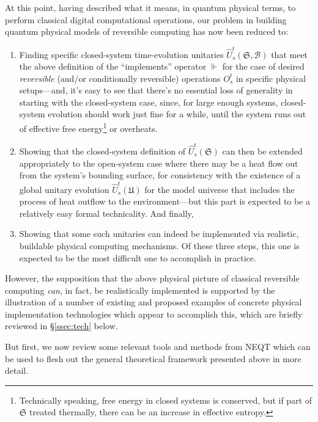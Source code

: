 \documentclass[preprints,article,accept,moreauthors,pdftex]{Definitions/mdpi}
\begin{document}
\begin{paracol}{2}
At this point, having described what it means, in quantum physical terms, to perform classical digital computational operations, our problem in building quantum physical models of reversible computing has now been reduced to:

\begin{enumerate}
    \item Finding specific closed-system time-evolution unitaries             $\widehat{U}_s^t(\mathfrak{S},\boldsymbol{\mathcal{B}})$ that meet the above definition of the ``implements'' operator $\Vdash$ for the case of desired \emph{reversible} (and/or conditionally reversible) operations $O_s^t$ in specific physical setups---and, it's easy to see that there's no essential loss of generality in starting with the closed-system case, since, for large enough systems, closed-system evolution should work just fine for a while, until the system runs out of effective free energy\footnote{Technically speaking, free energy in closed systems is conserved, but if part of $\mathfrak{S}$ treated thermally, there can be an increase in effective entropy.} or overheats.
    
    \item Showing that the closed-system definition of $\widehat{U}_s^t(\mathfrak{S})$ can then be extended appropriately to the open-system case where there may be a heat flow out from the system's bounding surface, for consistency with the existence of a global unitary evolution $\widehat{U}_s^t(\mathfrak{U})$ for the model universe that includes the process of heat outflow to the environment---but this part is expected to be a relatively easy formal technicality. And finally,
    
    \item Showing that some such unitaries can indeed be implemented via realistic, buildable physical computing mechanisms. Of these three steps, this one is expected to be the most difficult one to accomplish in practice.
\end{enumerate}

However, the supposition that the above physical picture of classical reversible computing \emph{can}, in fact, be realistically implemented is supported by the illustration of a number of existing and proposed examples of concrete physical implementation technologies which appear to accomplish this, which are briefly reviewed in \S\ref{ssec:tech} below.

But first, we now review some relevant tools and methods from NEQT which can be used to flesh out the general theoretical framework presented above in more detail.


\end{paracol}
\end{document}
